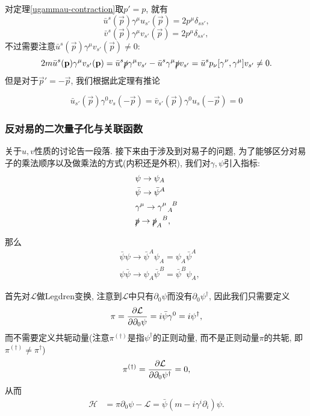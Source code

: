 对定理\ref{ugammau-contraction}取$p'=p$, 就有
\begin{equation}
    \bar u^s(\vec p)\gamma^\mu u_{s'}(\vec p)=2p^\mu\delta_{ss'}\label{gamma-p-p-contraction},
\end{equation}
\begin{equation}
    \bar v^s(\vec p)\gamma^\mu v_{s'}(\vec p)=2p^\mu\delta_{ss'},
\end{equation}
不过需要注意$\bar u^s(\vec p)\gamma^\mu v_{s'}(\vec p)\neq0$:
\begin{equation}
    2m\bar u^s(\vec p)\gamma^\mu v_{s'}(\vec p)=\bar u^s\slashed p\gamma^\mu v_{s'}-\bar u^s\gamma^\mu\slashed pv_{s'}=\bar u^sp_\nu[\gamma^\nu, \gamma^\mu]v_{s'}\neq0.
\end{equation}
但是对于$\vec p'=-\vec p$, 我们根据此定理有推论
\begin{theorem}\label{ubar-gamma-v}
    \begin{equation}
        \bar u_{s'}(\vec p)\gamma^0 v_s(-\vec p)=\bar v_{s'}(\vec p)\gamma^0 u_s(-\vec p)=0
    \end{equation}
\end{theorem}

\subsubsection{反对易的二次量子化与关联函数}
关于$u, v$性质的讨论告一段落. 接下来由于涉及到对易子的问题, 为了能够区分对易子的乘法顺序以及做乘法的方式(内积还是外积), 我们对$\gamma, \psi$引入指标:
\begin{align}
    &\psi\to\psi_A\\
    &\bar\psi\to\bar\psi^A\\
    &\gamma^\mu\to\gamma^{\mu~~B}_{~~A}\\
    &\slashed p\to\slashed p_A^{~~B},
\end{align}

那么
\begin{align}
    &\bar\psi\psi\to\bar\psi^A\psi_A=\psi_A\bar\psi^A\\
    &\psi\bar\psi\to\psi_A\bar\psi^B=\bar\psi^B\psi_A,
\end{align}

首先对$\mathcal L$做Legdren变换, 注意到$\mathcal L$中只有$\partial_0\psi$而没有$\partial_0\psi^\dagger$, 因此我们只需要定义
\begin{equation}
    \pi=\pa{\mathcal L}{\partial_0\psi}=i\bar\psi\gamma^0=i\psi^\dagger,
\end{equation}
而不需要定义共轭动量(注意$\pi^{(\dagger)}$是指$\psi^\dagger$的正则动量, 而不是正则动量$\pi$的共轭, 即$\pi^{(\dagger)}\neq\pi^\dagger$)
\begin{equation}
    \pi^{(\dagger)}=\pa{\mathcal L}{\partial_0\psi^\dagger}=0,
\end{equation}
从而
\begin{align}
    \mathcal H&=\pi\partial_0\psi-\mathcal L=\bar\psi(m-i\gamma^i\partial_i)\psi.
\end{align}

